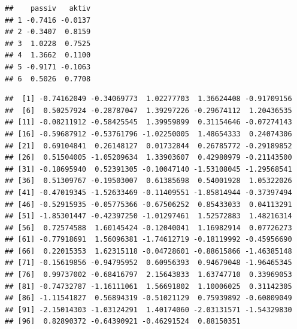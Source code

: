 \documentclass[]{article}
\newenvironment{Shaded}{\begin{snugshade}}{\end{snugshade}}
\newcommand{\KeywordTok}[1]{\textcolor[rgb]{0.13,0.29,0.53}{\textbf{{#1}}}}
\newcommand{\DecValTok}[1]{\textcolor[rgb]{0.00,0.00,0.81}{{#1}}}
\newcommand{\StringTok}[1]{\textcolor[rgb]{0.31,0.60,0.02}{{#1}}}
\newcommand{\CommentTok}[1]{\textcolor[rgb]{0.56,0.35,0.01}{\textit{{#1}}}}
\newcommand{\NormalTok}[1]{{#1}}
\begin{document}
\begin{Shaded}
\end{Shaded}

\begin{verbatim}
##    passiv   aktiv
## 1 -0.7416 -0.0137
## 2 -0.3407  0.8159
## 3  1.0228  0.7525
## 4  1.3662  0.1100
## 5 -0.9171 -0.1063
## 6  0.5026  0.7708
\end{verbatim}

\begin{Shaded}
\end{Shaded}

\begin{verbatim}
##  [1] -0.74162049 -0.34069773  1.02277703  1.36624408 -0.91709156
##  [6]  0.50257924 -0.28787047  1.39297226 -0.29674112  1.20436535
## [11] -0.08211912 -0.58425545  1.39959899  0.31154646 -0.07274143
## [16] -0.59687912 -0.53761796 -1.02250005  1.48654333  0.24074306
## [21]  0.69104841  0.26148127  0.01732844  0.26785772 -0.29189852
## [26]  0.51504005 -1.05209634  1.33903607  0.42980979 -0.21143500
## [31] -0.18695940  0.52391305 -0.10047140 -1.53108045 -1.29568541
## [36]  0.51309767 -0.19503007  0.61385698  0.54001928  1.05322026
## [41] -0.47019345 -1.52633469 -0.11409551 -1.85814944 -0.37397494
## [46] -0.52915935 -0.05775366 -0.67506252  0.85433033  0.04113291
## [51] -1.85301447 -0.42397250 -1.01297461  1.52572883  1.48216314
## [56]  0.72574588  1.60145424 -0.12040041  1.16982914  0.07726273
## [61] -0.77918691  1.56096381 -1.74612719 -0.18119992 -0.45956690
## [66]  0.22015353  1.62315118 -0.04728601 -0.88615866 -1.46385148
## [71] -0.15619856 -0.94795952  0.60956393  0.94679048 -1.96465345
## [76]  0.99737002 -0.68416797  2.15643833  1.63747710  0.33969053
## [81] -0.74732787 -1.16111061  1.56691802  1.10006025  0.31142305
## [86] -1.11541827  0.56894319 -0.51021129  0.75939892 -0.60809049
## [91] -2.15014303 -1.03124291  1.40174060 -2.03131571 -1.54329830
## [96]  0.82890372 -0.64390921 -0.46291524  0.88150351
\end{verbatim}
\end{document}
